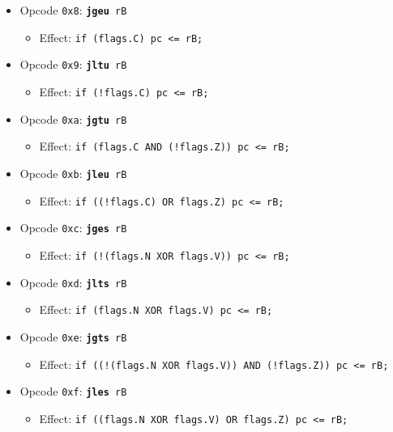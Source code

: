 \documentclass{article}
\begin{document}
\begin{itemize}
		\item Opcode \texttt{0x8}:
			\texttt{\textbf{jgeu} rB}
		\begin{itemize}
			\item Effect:
				\texttt{if (flags.C) pc <= rB;}
		\end{itemize}

		\item Opcode \texttt{0x9}:
			\texttt{\textbf{jltu} rB}
		\begin{itemize}
			\item Effect:
				\texttt{if (!flags.C) pc <= rB;}
		\end{itemize}

		\item Opcode \texttt{0xa}:
			\texttt{\textbf{jgtu} rB}
		\begin{itemize}
			\item Effect:
				\texttt{if (flags.C AND (!flags.Z)) pc <= rB;}
		\end{itemize}

		\item Opcode \texttt{0xb}:
			\texttt{\textbf{jleu} rB}
		\begin{itemize}
			\item Effect:
				\texttt{if ((!flags.C) OR flags.Z) pc <= rB;}
		\end{itemize}

		\item Opcode \texttt{0xc}:
			\texttt{\textbf{jges} rB}
		\begin{itemize}
			\item Effect:
				\texttt{if (!(flags.N XOR flags.V)) pc <= rB;}
		\end{itemize}

		\item Opcode \texttt{0xd}:
			\texttt{\textbf{jlts} rB}
		\begin{itemize}
			\item Effect:
				\texttt{if (flags.N XOR flags.V) pc <= rB;}
		\end{itemize}

		\item Opcode \texttt{0xe}:
			\texttt{\textbf{jgts} rB}
		\begin{itemize}
			\item Effect:
				\texttt{if ((!(flags.N XOR flags.V)) AND (!flags.Z))
					pc <= rB;}
		\end{itemize}

		\item Opcode \texttt{0xf}:
			\texttt{\textbf{jles} rB}
		\begin{itemize}
			\item Effect:
				\texttt{if ((flags.N XOR flags.V) OR flags.Z)
					pc <= rB;}
		\end{itemize}
	\end{itemize}
\end{document}
